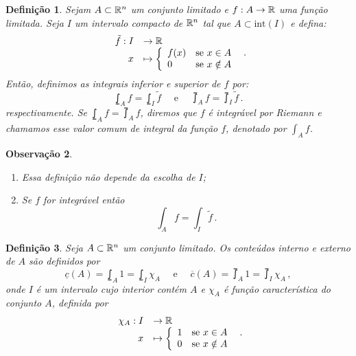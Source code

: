 \documentclass[a4paper,12pt]{extreport}
\newtheorem{mydef}{Definição}
\newtheorem{myobs}[mydef]{Observação}
\newif\ifspacesbetweentheos
\newcommand{\theospace}[1]{
\ifspacesbetweentheos
  \vspace{#1}
\fi
}
\begin{document}
\begin{mydef}
  Sejam $A \subset \mathbb{R}^n$ um conjunto limitado e
  $f: A \to \mathbb{R}$ uma função limitada.
  Seja $I$ um intervalo compacto de $\mathbb{R}^n$
  tal que $A \subset \mathrm{int}(I)$
  e defina:
  $$
   \begin{array}{rl} \tilde f: I &\to \mathbb{R}\\ x &\mapsto \left\{
      \begin{array}{ll}
        f(x) & \text{se } x \in A\\
        0    & \text{se } x \notin A
      \end{array}\right.
   \end{array} \,.
  $$
  Então, definimos as \emph{integrais inferior e superior}
  de $f$ por:
  \begin{equation}
    \lowint_A f = \lowint_I \tilde f
    \quad\text{ e }\quad
    \upint_A f = \upint_I \tilde f \,.
  \end{equation}
  respectivamente.
  Se $\lowint_A f = \upint_A f$,
  diremos que $f$ é \emph{integrável por Riemann}
  e chamamos esse valor comum
  de \emph{integral} da função $f$,
  denotado por $\int_A f$.
\end{mydef}

\begin{myobs}
  \begin{enumerate}[label=\alph*)]
  \item Essa definição não depende da escolha de $I$;
  \item Se $f$ for integrável então
    \begin{equation}
      \int_A f = \int_I \tilde f\,.
    \end{equation}
  \end{enumerate}
\end{myobs}



\theospace{3cm}



\begin{mydef}
  Seja $A \subset \mathbb{R}^n$ um conjunto limitado.
  Os \emph{conteúdos interno e externo} de $A$
  são definidos por
  \begin{equation}
    \underline{c}(A) = \lowint_A 1 = \lowint_I \chi_A
    \quad \text{ e } \quad
    \overline{c}(A) = \upint_A 1 = \upint_I \chi_A\,,
  \end{equation}
  onde $I$ é um intervalo cujo interior contém $A$ e
  $\chi_A$ é \emph{função característica} do conjunto $A$,
  definida por
  $$
   \begin{array}{rl} \chi_A: I &\to \mathbb{R}\\ x &\mapsto \left\{
      \begin{array}{ll}
        1 & \text{se } x \in A\\
        0 & \text{se } x \notin A
      \end{array}\right.
   \end{array} \,.
  $$
\end{mydef}
\end{document}
